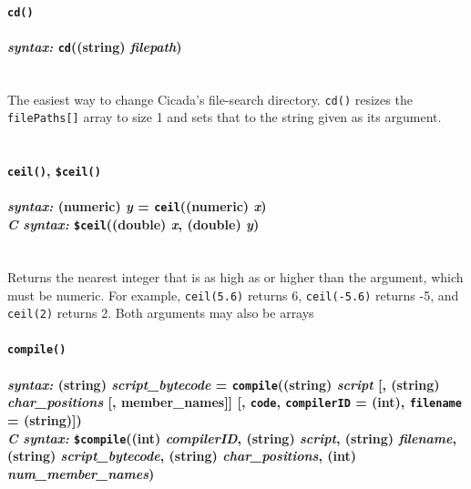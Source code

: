 \documentclass{article}
\begin{document}

\paragraph{\texttt{cd()}\\\\
\normalfont \emph{syntax: } \texttt{cd}((string) \emph{filepath})\\\\}

The easiest way to change Cicada's file-search directory.  \verb#cd()# resizes the \verb#filePaths[]# array to size 1 and sets that to the string given as its argument.\\\\




\paragraph{\texttt{ceil()}, \texttt{\$ceil()}\\\\
\normalfont \emph{syntax: } (numeric) \emph{y} = \texttt{ceil}((numeric) \emph{x})\\
\normalfont \emph{C syntax: } \texttt{\$ceil}((double) \emph{x}, (double) \emph{y})\\\\}

Returns the nearest integer that is as high as or higher than the argument, which must be numeric.  For example, \verb$ceil(5.6)$ returns 6, \verb$ceil(-5.6)$ returns -5, and \verb$ceil(2)$ returns 2.  Both arguments may also be arrays\\



 


\paragraph{\texttt{compile()}\\\\
\normalfont \emph{syntax: } (string) \emph{script\_bytecode} = \texttt{compile}((string) \emph{script} [, (string) \emph{char\_positions} [, member\_names]] [, \texttt{code}, \texttt{compilerID} = (int), \texttt{filename} = (string)])\\
\normalfont \emph{C syntax: } \texttt{\$compile}((int) \emph{compilerID}, (string) \emph{script}, (string) \emph{filename}, (string) \emph{script\_bytecode}, (string) \emph{char\_positions}, (int) \emph{num\_member\_names})\\\\}
\end{document}
